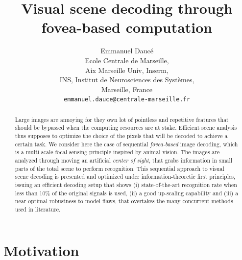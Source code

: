 \documentclass{article}
\title{Visual scene decoding through fovea-based computation} %
\author{
  Emmanuel Daucé\\
  Ecole Centrale de Marseille,\\ 
  Aix Marseille Univ, Inserm,\\ 
  INS, Institut de Neurosciences des Systèmes, \\
  Marseille, France\\
  \texttt{emmanuel.dauce@centrale-marseille.fr} 
}
\begin{document}

\maketitle

\begin{abstract}
Large images are annoying for they own lot of pointless and repetitive features that should be bypassed
when the computing resources are at stake. Efficient scene analysis thus supposes to optimize the choice of the 
pixels that will be decoded to achieve a certain task. We consider here the case of sequential \emph{fovea-based} image decoding, which 
is a multi-scale focal sensing principle inspired by animal vision. The images are analyzed  
through moving an artificial \emph{center of sight}, that grabs information in small parts of the total scene 
to perform recognition. 
This sequential approach to visual scene decoding is presented and optimized under 
information-theoretic first principles, issuing an efficient decoding setup that shows (i) 
state-of-the-art recognition rate when less than 10\% of the original signals is used, (ii) a good up-scaling capability 
and (iii) a near-optimal robustness to model flaws, that overtakes the many concurrent methods 
used in literature.
\end{abstract}

\section{Motivation}
\end{document}

